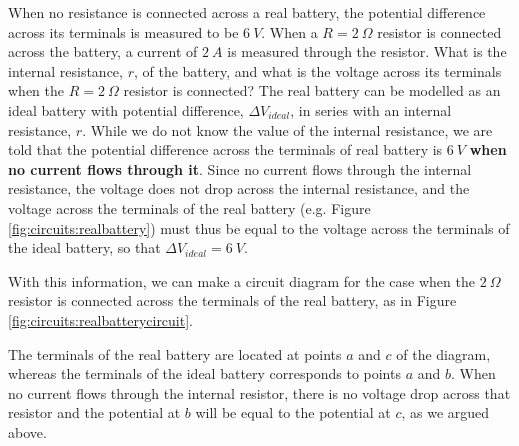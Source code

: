 \begin{example}{When no resistance is connected across a real battery, the potential difference across its terminals is measured to be $\SI{6}{V}$. When a $R=\SI{2}{\Omega}$ resistor is connected across the battery, a current of $\SI{2}{A}$ is measured through the resistor. What is the internal resistance, $r$, of the battery, and what is the voltage across its terminals when the $R=\SI{2}{\Omega}$ resistor is connected?}
The real battery can be modelled as an ideal battery with potential difference, $\Delta V_{ideal}$, in series with an internal resistance, $r$. While we do not know the value of the internal resistance, we are told that the potential difference across the terminals of real battery is $\SI{6}{V}$ \textbf{when no current flows through it}. Since no current flows through the internal resistance, the voltage does not drop across the internal resistance, and the voltage across the terminals of the real battery (e.g. Figure \ref{fig:circuits:realbattery}) must thus be equal to the voltage across the terminals of the ideal battery, so that $\Delta V_{ideal}=\SI{6}{V}$.

With this information, we can make a circuit diagram for the case when the $\SI{2}{\Omega}$ resistor is connected across the terminals of the real battery, as in Figure \ref{fig:circuits:realbatterycircuit}.


The terminals of the real battery are located at points $a$ and $c$ of the diagram, whereas the terminals of the ideal battery corresponds to points $a$ and $b$. When no current flows through the internal resistor, there is no voltage drop across that resistor and the potential at $b$ will be equal to the potential at $c$, as we argued above.


\end{example}
